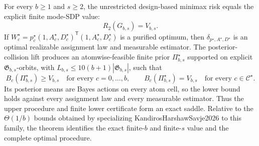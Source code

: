 For every \(b\ge1\) and \(s\ge2\), the unrestricted design-based minimax risk equals the explicit finite mode-SDP value: \[R_2(G_{b,s})=V_{b,s}.\] If \(W_c^{\star}=p_c^{\star}(1,A_c^{\star},D_c^{\star})^{\mathsf T}(1,A_c^{\star},D_c^{\star})\) is a purified optimum, then \(\delta_{p^{\star},A^{\star},D^{\star}}\) is an optimal realizable assignment law and measurable estimator. The posterior-collision lift produces an atomwise-feasible finite prior \(\Pi_{b,s}^{\star}\) supported on explicit \(\mathfrak G_{b,s}\)-orbits, with \(L_{b,s}\le10(b+1)|\mathfrak G_{b,s}|\), such that \[B_c(\Pi_{b,s}^{\star})\ge V_{b,s}\quad\text{for every }c=0,\ldots,b,\qquad B_c(\Pi_{b,s}^{\star})=V_{b,s}\quad\text{for every }c\in\mathcal C^{\star}.\] Its posterior means are Bayes actions on every atom cell, so the lower bound holds against every assignment law and every measurable estimator. Thus the upper procedure and finite lower certificate form an exact saddle. Relative to the \(\Theta(1/b)\) bounds obtained by specializing KandirosHarshawSavje2026 to this family, the theorem identifies the exact finite-\(b\) and finite-\(s\) value and the complete optimal procedure.